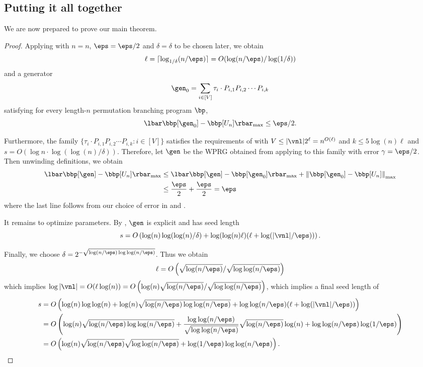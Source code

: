 \subsection{Putting it all together}
We are now prepared to prove our main theorem.
\cycleMatrix*
\begin{proof}
Applying  with $n=n$, $\eps=\eps/2$ and $\delta=\delta$ to be chosen later, we obtain 
$$\ell=\lceil \log_{1/\delta}(n/\eps)\rceil = O(\log(n/\eps)/\log(1/\delta))$$ 
and a generator
\[\gen_0 = \sum_{i\in [V]}\tau_i\cdot P_{i,1}P_{i,2}\cdots P_{i,k}\]
satisfying for every length-$n$ permutation branching program $\bp$,
$$\lbar\bbp[\gen_0] - \bbp[U_n]\rbar_{\max}\leq \eps/2.$$

Furthermore, the family $\{\tau_i\cdot P_{i,1}P_{i,2}\cdots P_{i,k}:i\in [V]\}$ satisfies the requirements of  with $V\leq |\vnl|2^\ell=n^{O(\ell)}$ and $k\leq 5\log(n)\ell$ and $s=O(\log n\cdot\log(\log(n)/\delta))$. Therefore, let $\gen$ be the WPRG obtained from applying  to this family with error $\gamma=\eps/2$.\\

Then unwinding definitions, we obtain
\begin{align*}
    \lbar\bbp[\gen]-\bbp[U_n]\rbar_{\max} &\leq \lbar\bbp[\gen]- \bbp[\gen_0]\rbar_{\max}+ \left\|\bbp[\gen_0] - \bbp[U_n]\right\|_{\max}\\
    &\leq \frac{\eps}{2}+\frac{\eps}{2} = \eps
\end{align*}
where the last line follows from our choice of error in  and .

It remains to optimize parameters. By , $\gen$ is explicit and has seed length
\[s=O\left(\log(n)\log(\log(n)/\delta) + \log(\log(n)\ell)(\ell+\log(|\vnl|/\eps))\right).\]

Finally, we choose $\delta=2^{-\sqrt{\log(n/\eps)\log\log(n/\eps)}}$. Thus we obtain 
$$\ell=O\left(\sqrt{\log(n/\eps)}/\sqrt{\log\log(n/\eps)}\right)$$
which implies $\log|\vnl|=O(\ell\log(n))=O\left(\log(n)\sqrt{\log(n/\eps)}/\sqrt{\log\log(n/\eps)}\right)$, which implies a final seed length of
\begin{align*}
    s &= O\left(\log(n)\log\log(n) +\log(n)\sqrt{\log(n/\eps)\log\log(n/\eps)} + \log\log(n/\eps)(\ell+\log(|\vnl|/\eps))\right)\\
    &= O\left(\log(n)\sqrt{\log(n/\eps)\log\log(n/\eps)} + \frac{\log\log(n/\eps)}{\sqrt{\log\log(n/\eps)}}\sqrt{\log(n/\eps)}\log(n)+\log\log(n/\eps)\log(1/\eps)\right)\\
    &= O\left(\log(n)\sqrt{\log(n/\eps)}\sqrt{\log\log(n/\eps)}+ \log(1/\eps)\log\log(n/\eps)\right). \qedhere
\end{align*}
\end{proof}




